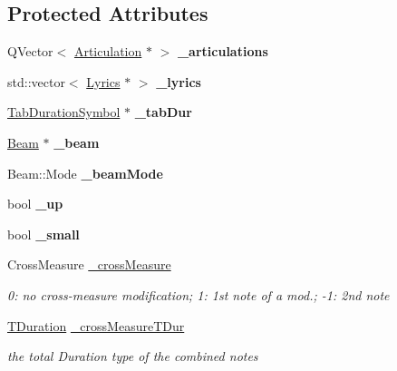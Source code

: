 \subsection*{Protected Attributes}
\begin{DoxyCompactItemize}
\item 
\mbox{\label{class_ms_1_1_chord_rest_a0f030fbf7070e04a433b25ceaaa632b7}} 
Q\+Vector$<$ \hyperlink{class_ms_1_1_articulation}{Articulation} $\ast$ $>$ {\bfseries \+\_\+articulations}
\item 
\mbox{\label{class_ms_1_1_chord_rest_af7114fc7e905b5e6ff68d12632ad55ce}} 
std\+::vector$<$ \hyperlink{class_ms_1_1_lyrics}{Lyrics} $\ast$ $>$ {\bfseries \+\_\+lyrics}
\item 
\mbox{\label{class_ms_1_1_chord_rest_ac3f0e7cb31d700abc5e1d261e0aab7b1}} 
\hyperlink{class_ms_1_1_tab_duration_symbol}{Tab\+Duration\+Symbol} $\ast$ {\bfseries \+\_\+tab\+Dur}
\item 
\mbox{\label{class_ms_1_1_chord_rest_ac3715cb6c5477152068cfedb5ce12124}} 
\hyperlink{class_ms_1_1_beam}{Beam} $\ast$ {\bfseries \+\_\+beam}
\item 
\mbox{\label{class_ms_1_1_chord_rest_ada1f9e9879ce56d0a211b5fba705cf68}} 
Beam\+::\+Mode {\bfseries \+\_\+beam\+Mode}
\item 
\mbox{\label{class_ms_1_1_chord_rest_ae13b24ceed9d3561f107f7e3ea72de44}} 
bool {\bfseries \+\_\+up}
\item 
\mbox{\label{class_ms_1_1_chord_rest_ad069f6a28a4eaca5f5ba223d072fd72f}} 
bool {\bfseries \+\_\+small}
\item 
\mbox{\label{class_ms_1_1_chord_rest_a31164d5f203926c37f06a5ae8832793d}} 
Cross\+Measure \hyperlink{class_ms_1_1_chord_rest_a31164d5f203926c37f06a5ae8832793d}{\+\_\+cross\+Measure}
\begin{DoxyCompactList}\small\item\em 0\+: no cross-\/measure modification; 1\+: 1st note of a mod.; -\/1\+: 2nd note \end{DoxyCompactList}\item 
\mbox{\label{class_ms_1_1_chord_rest_aba0cce6921c0cca20dbd41197e4e58d9}} 
\hyperlink{class_ms_1_1_t_duration}{T\+Duration} \hyperlink{class_ms_1_1_chord_rest_aba0cce6921c0cca20dbd41197e4e58d9}{\+\_\+cross\+Measure\+T\+Dur}
\begin{DoxyCompactList}\small\item\em the total Duration type of the combined notes \end{DoxyCompactList}\end{DoxyCompactItemize}
